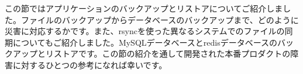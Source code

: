 この節ではアプリケーションのバックアップとリストアについてご紹介しました。ファイルのバックアップからデータベースのバックアップまで、どのように災害に対応するかです。また、rsyncを使った異なるシステムでのファイルの同期についてもご紹介しました。MySQLデータベースとredisデータベースのバックアップとリストアです。この節の紹介を通して開発された本番プロダクトの障害に対するひとつの参考になれば幸いです。